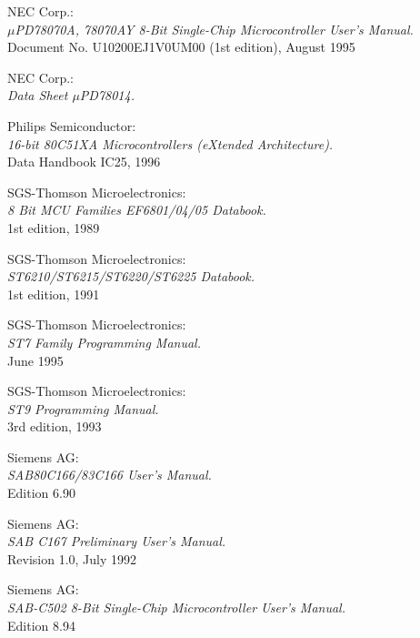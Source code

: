 \documentclass[12pt,twoside]{report}
\begin{document}
\begin{thebibliography}{99}
 NEC Corp.: \\
                {\em $\mu$PD78070A, 78070AY 8-Bit Single-Chip Microcontroller
                 User's Manual.\/} \\
                Document No. U10200EJ1V0UM00 (1st edition), August 1995

 NEC Corp.: \\
                  {\em Data Sheet $\mu$PD78014.\/}

 Philips Semiconductor: \\
                 {\em 16-bit 80C51XA Microcontrollers (eXtended
                  Architecture).\/} \\
                 Data Handbook IC25, 1996

 SGS-Thomson Microelectronics: \\
                {\em 8 Bit MCU Families EF6801/04/05 Databook.\/}\\
                1st edition, 1989

 SGS-Thomson Microelectronics: \\
                {\em ST6210/ST6215/ST6220/ST6225 Databook.\/} \\
                1st edition, 1991

 SGS-Thomson Microelectronics: \\
                 {\em ST7 Family Programming Manual.\/} \\
                 June 1995

 SGS-Thomson Microelectronics: \\
               {\em ST9 Programming Manual.\/} \\
               3rd edition, 1993

 Siemens AG: \\
                  {\em SAB80C166/83C166 User's Manual.\/} \\
                  Edition 6.90

 Siemens AG: \\
                  {\em SAB C167 Preliminary User's Manual.\/} \\
                  Revision 1.0, July 1992

 Siemens AG: \\
                  {\em SAB-C502 8-Bit Single-Chip Microcontroller User's
                   Manual.\/} \\
                  Edition 8.94


\end{thebibliography}
\end{document}
